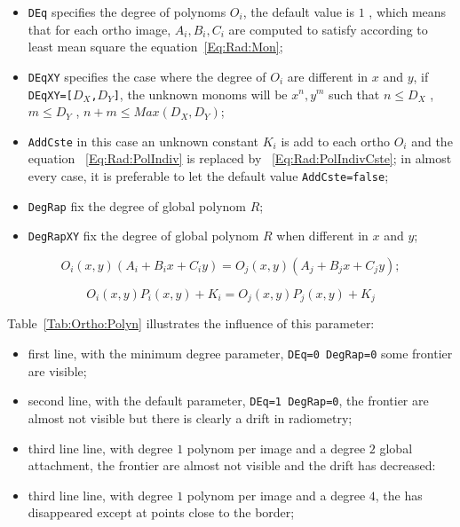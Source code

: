 \begin{itemize}
  \item {\tt DEq} specifies the degree of polynoms $O_i$, the default value is
	$1$ , which means that for each ortho image, $A_i,B_i,C_i$ are computed
	to satisfy according to least mean square the equation~\ref{Eq:Rad:Mon};

   \item {\tt DEqXY} specifies the case where the degree of $O_i$ are different in
	 $x$ and $y$, if  {\tt DEqXY=[$D_X$,$D_Y$]}, the unknown monoms will
	 be $x^n,y^m$ such that $n\leq D_X$ , $m\leq D_Y$ ,   $n+m\leq Max(D_X,D_Y)$;

   \item {\tt AddCste} in this case an unknown constant $K_i$ is add to each ortho $O_i$ and
	  the equation ~\ref{Eq:Rad:PolIndiv} is replaced by ~\ref{Eq:Rad:PolIndivCste};
	  in almost every case, it is preferable to let the default value {\tt AddCste=false};

   \item {\tt DegRap} fix the degree of global polynom $R$;

   \item {\tt DegRapXY} fix the degree of global polynom $R$ when different in $x$ and $y$;

\end{itemize}



\begin{equation}
O_i(x,y)(A_i+B_ix+C_iy)=O_j(x,y)(A_j+B_jx+C_jy);
\label{Eq:Rad:Mon}
\end{equation}

\begin{equation}
   O_i(x,y) P_i(x,y) + K_i = O_j(x,y) P_j(x,y) + K_j
\label{Eq:Rad:PolIndivCste}
\end{equation}

Table~\ref{Tab:Ortho:Polyn} illustrates the influence of this parameter:

\begin{itemize}
   \item first line, with the minimum degree parameter, {\tt DEq=0 DegRap=0} some
	 frontier are visible;
   \item second line, with the default parameter, {\tt DEq=1 DegRap=0}, the frontier
	 are almost not visible but there is clearly a drift in radiometry;
   \item third line line, with  degree $1$ polynom per image and a degree $2$ global
	 attachment, the frontier are almost not visible and the drift has decreased:
   \item third line line, with  degree $1$ polynom per image and a degree $4$, the
	 has disappeared except at points close to the border;
\end{itemize}

